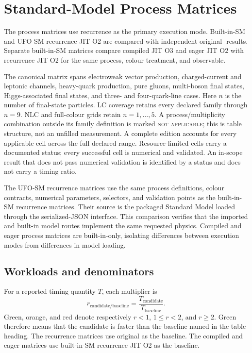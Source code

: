 \section{Standard-Model Process Matrices}
\label{sec:three-mode-performance-tables}

The process matrices use recurrence as the primary \PAC{} execution mode.
Built-in-SM and UFO-SM recurrence JIT O2 are compared with independent
original-\AC{} results.  Separate built-in-SM matrices compare compiled JIT O3
and eager JIT O2 with recurrence JIT O2 for the same process, colour treatment,
and observable.

The canonical matrix spans electroweak vector production, charged-current and
leptonic channels, heavy-quark production, pure gluons, multi-boson final
states, Higgs-associated final states, and three- and four-quark-line cases.
Here \(n\) is the number of final-state particles.  LC coverage retains every
declared family through \(n=9\).  NLC and full-colour grids retain
\(n=1,\ldots,5\).  A process/multiplicity combination outside its family
definition is marked \textsc{not applicable}; this is table structure, not an
unfilled measurement.  A complete edition accounts for every applicable cell
across the full declared range.  Resource-limited cells carry a documented
status; every successful cell is numerical and validated.  An in-scope result
that does not pass numerical validation is identified by a status and does
not carry a timing ratio.

The UFO-SM recurrence matrices use the same process definitions, colour
contracts, numerical parameters, selectors, and validation points as the
built-in-SM recurrence matrices. Their source is the packaged Standard Model
loaded through the serialized-JSON interface. This comparison verifies that the
imported and built-in model routes implement the same requested physics.
Compiled and eager process matrices are built-in-only, isolating differences
between execution modes from differences in model loading.



\subsection*{Workloads and denominators}

For a reported timing quantity \(T\), each multiplier is
\begin{equation}
  r_{\mathrm{candidate/baseline}}
  = \frac{T_{\mathrm{candidate}}}{T_{\mathrm{baseline}}}.
  \label{eq:three-mode-matrix-time-ratio}
\end{equation}
Green, orange, and red denote respectively \(r<1\), \(1\leq r<2\), and
\(r\geq2\).  Green therefore means that the candidate is faster than the
baseline named in the table heading.  The recurrence matrices use original
\AC{} as the baseline.  The compiled and eager matrices use built-in-SM
recurrence JIT O2 as the baseline.

